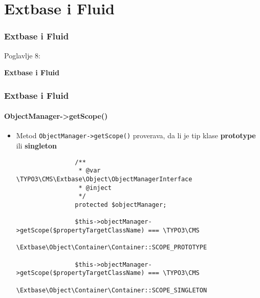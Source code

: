 %

\section{Extbase i Fluid}
\begin{frame}[fragile]
	\frametitle{Extbase i Fluid}

	\begin{center}\huge{Poglavlje 8:}\end{center}
	\begin{center}\huge{\color{typo3darkgrey}\textbf{Extbase i Fluid}}\end{center}

\end{frame}


\begin{frame}[fragile]
	\frametitle{Extbase i Fluid}
	\framesubtitle{ObjectManager->getScope()}

	\lstset{
		basicstyle=\tiny\ttfamily
	}

	\begin{itemize}
		\item Metod \texttt{ObjectManager->getScope()} proverava,\newline
			da li je tip klase \textbf{prototype} ili \textbf{singleton}

			\begin{lstlisting}
				/**
				 * @var \TYPO3\CMS\Extbase\Object\ObjectManagerInterface
				 * @inject
				 */
				protected $objectManager;

				$this->objectManager->getScope($propertyTargetClassName) === \TYPO3\CMS
				\Extbase\Object\Container\Container::SCOPE_PROTOTYPE

				$this->objectManager->getScope($propertyTargetClassName) === \TYPO3\CMS
				\Extbase\Object\Container\Container::SCOPE_SINGLETON
			\end{lstlisting}

	\end{itemize}

\end{frame}

